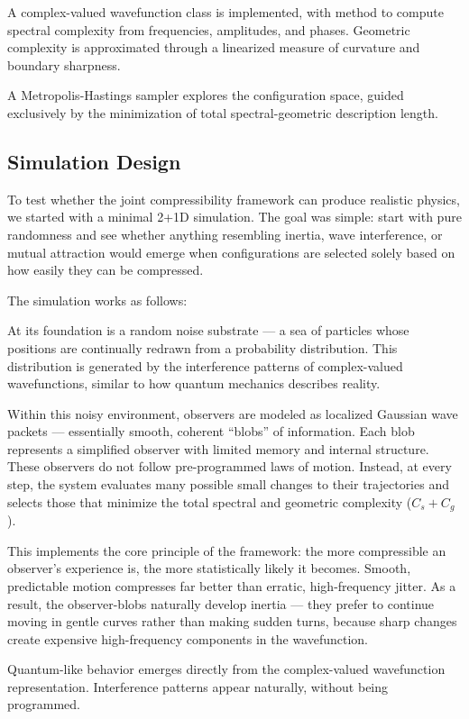 A complex-valued wavefunction class is implemented, with method to compute spectral complexity from frequencies, amplitudes, and phases.
Geometric complexity is approximated through a linearized measure of curvature and boundary sharpness.

A Metropolis-Hastings sampler explores the configuration space, guided exclusively by the minimization of total spectral-geometric description length.

\subsection*{Simulation Design}

To test whether the joint compressibility framework can produce realistic physics, we started with a minimal 2+1D simulation.
The goal was simple: start with pure randomness and see whether anything resembling inertia, wave interference, or mutual attraction would emerge when configurations are selected solely based on how easily they can be compressed.

The simulation works as follows:

At its foundation is a random noise substrate — a sea of particles whose positions are continually redrawn from a probability distribution.
This distribution is generated by the interference patterns of complex-valued wavefunctions, similar to how quantum mechanics describes reality.

Within this noisy environment, observers are modeled as localized Gaussian wave packets — essentially smooth, coherent “blobs” of information.
Each blob represents a simplified observer with limited memory and internal structure.
These observers do not follow pre-programmed laws of motion.
Instead, at every step, the system evaluates many possible small changes to their trajectories and selects those that minimize the total spectral and geometric complexity (\(C_s + C_g\)).

This implements the core principle of the framework: the more compressible an observer’s experience is, the more statistically likely it becomes.
Smooth, predictable motion compresses far better than erratic, high-frequency jitter.
As a result, the observer-blobs naturally develop inertia — they prefer to continue moving in gentle curves rather than making sudden turns, because sharp changes create expensive high-frequency components in the wavefunction.

Quantum-like behavior emerges directly from the complex-valued wavefunction representation.
Interference patterns appear naturally, without being programmed.

